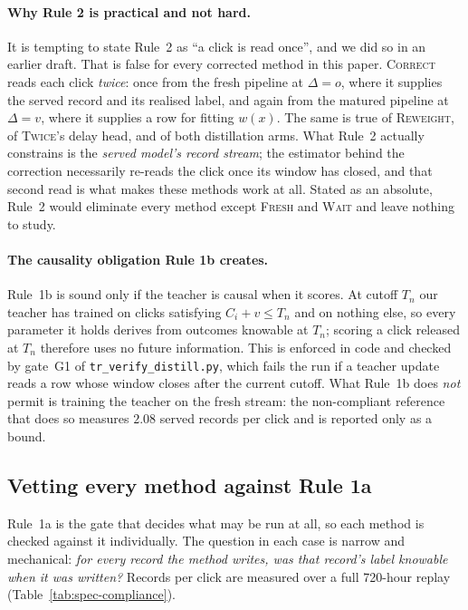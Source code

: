 \paragraph{Why Rule 2 is practical and not hard.} It is tempting to state Rule~2 as ``a click is
read once'', and we did so in an earlier draft. That is false for every corrected method in this
paper. \textsc{Correct} reads each click \emph{twice}: once from the fresh pipeline at $\Delta=o$,
where it supplies the served record and its realised label, and again from the matured pipeline at
$\Delta=v$, where it supplies a row for fitting $w(x)$. The same is true of \textsc{Reweight}, of
\textsc{Twice}'s delay head, and of both distillation arms. What Rule~2 actually constrains is the
\emph{served model's record stream}; the estimator behind the correction necessarily re-reads the
click once its window has closed, and that second read is what makes these methods work at all.
Stated as an absolute, Rule~2 would eliminate every method except \textsc{Fresh} and \textsc{Wait}
and leave nothing to study.

\paragraph{The causality obligation Rule 1b creates.} Rule~1b is sound only if the teacher is
causal when it scores. At cutoff $T_n$ our teacher has trained on clicks satisfying
$C_i + v \le T_n$ and on nothing else, so every parameter it holds derives from outcomes knowable
at $T_n$; scoring a click released at $T_n$ therefore uses no future information. This is enforced
in code and checked by gate~G1 of \texttt{tr\_verify\_distill.py}, which fails the run if a teacher
update reads a row whose window closes after the current cutoff. What Rule~1b does \emph{not}
permit is training the teacher on the fresh stream: the non-compliant reference that does so
measures $2.08$ served records per click and is reported only as a bound.

\subsection{Vetting every method against Rule 1a}\label{app:compliance}

Rule~1a is the gate that decides what may be run at all, so each method is checked against it
individually. The question in each case is narrow and mechanical: \emph{for every record the
method writes, was that record's label knowable when it was written?} Records per click are
measured over a full 720-hour replay (Table~\ref{tab:spec-compliance}).

